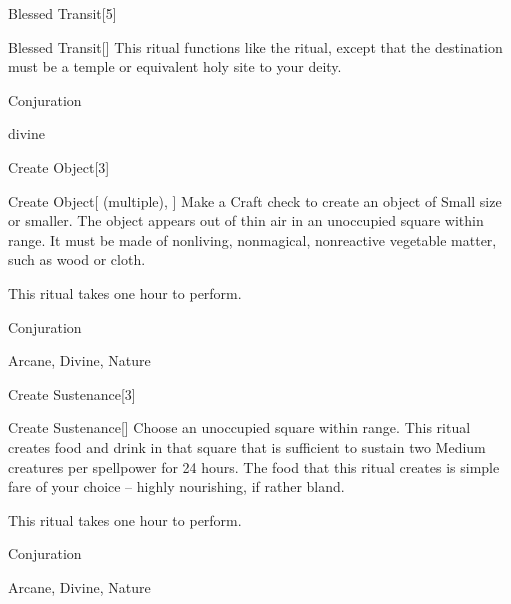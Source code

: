 \begin{spellsection}{Blessed Transit}[5]


\begin{ability}{Blessed Transit}[]
This ritual functions like the  ritual, except that the destination must be a temple or equivalent holy site to your deity.
\end{ability}




 Conjuration

 divine
\end{spellsection}


\begin{spellsection}{Create Object}[3]


\begin{ability}{Create Object}[ (multiple), ]
Make a Craft check to create an object of Small size or smaller.
The object appears out of thin air in an unoccupied square within \rngclose range.
It must be made of nonliving, nonmagical, nonreactive vegetable matter, such as wood or cloth.

This ritual takes one hour to perform.
\end{ability}




 Conjuration

 Arcane, Divine, Nature
\end{spellsection}


\begin{spellsection}{Create Sustenance}[3]


\begin{ability}{Create Sustenance}[]
Choose an unoccupied square within \rngclose range.
This ritual creates food and drink in that square that is sufficient to sustain two Medium creatures per spellpower for 24 hours.
The food that this ritual creates is simple fare of your choice -- highly nourishing, if rather bland.

This ritual takes one hour to perform.
\end{ability}




 Conjuration

 Arcane, Divine, Nature
\end{spellsection}


